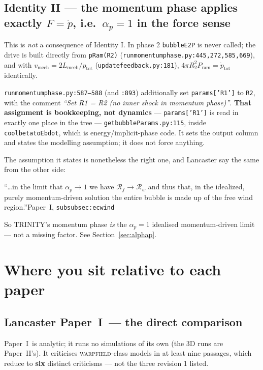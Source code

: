 \documentclass[11pt,a4paper,oneside]{report}
\newcommand{\brkus}{\textunderscore\allowbreak}
\newcommand{\code}[1]{\texttt{\small\let\_\brkus #1}}
\newcommand{\lbl}[1]{\texttt{\footnotesize\let\_\brkus #1}}
\newcommand{\PI}{Paper~I}
\newcommand{\PII}{Paper~II}
\newcommand{\Rw}{\mathcal{R}_{w}}
\newcommand{\Rf}{\mathcal{R}_{f}}
\newcommand{\pdotw}{\dot p}
\newcommand{\ap}{\alpha_p}
\newcommand{\Pram}{P_{\mathrm{ram}}}
\newcommand{\up}[1]{\textcolor{tqaccent}{\textbf{#1}}}
\begin{document}
\subsection*{Identity II --- the momentum phase applies exactly $F=\pdotw$, i.e.\ $\ap=1$ in the
force sense}

This is \emph{not} a consequence of Identity I. In phase 2 \code{bubble\_E2P} is never called; the
drive is built directly from \code{pRam(R2)} (\code{run\_momentum\_phase.py:445,272,585,669}), and
with $v_{\mathrm{mech}}=2L_{\mathrm{mech}}/\pdotw_{\mathrm{tot}}$ (\code{update\_feedback.py:181}),
$4\pi R_2^2 \Pram = \pdotw_{\mathrm{tot}}$ identically.

\code{run\_momentum\_phase.py:587--588} (and \code{:893}) additionally set
\code{params['R1']} to \code{R2}, with the comment \emph{``Set R1 = R2 (no inner shock in momentum
phase)''}. \up{That assignment is bookkeeping, not dynamics} --- \code{params['R1']} is read in
exactly one place in the tree --- \code{get\_bubbleParams.py:115}, inside
\code{cool\_beta\_to\_Ebdot}, which is energy/implicit-phase code. It sets the output column and states the modelling assumption;
it does not force anything.

The assumption it states is nonetheless the right one, and Lancaster say the same from the other
side:

\begin{litquote}
\small ``\ldots in the limit that $\ap \to 1$ we have $\Rf \to \Rw$ and thus that, in the
idealized, purely momentum-driven solution the entire bubble is made up of the free wind
region.''\hfill{\scriptsize\PI, \lbl{subsubsec:ec\_wind}}
\end{litquote}

So TRINITY's momentum phase \emph{is} the $\ap = 1$ idealised momentum-driven limit ---
not a missing factor. See Section~\ref{sec:alphap}.

\section{Where you sit relative to each paper}

\subsection{Lancaster \PI\ --- the direct comparison}
\label{sec:lanc1}

\PI\ is analytic; it runs no simulations of its own (the 3D runs are \PII's). It criticises
\textsc{warpfield}-class models in at least nine passages, which reduce to \up{six} distinct
criticisms --- not the three revision 1 listed.
\end{document}
